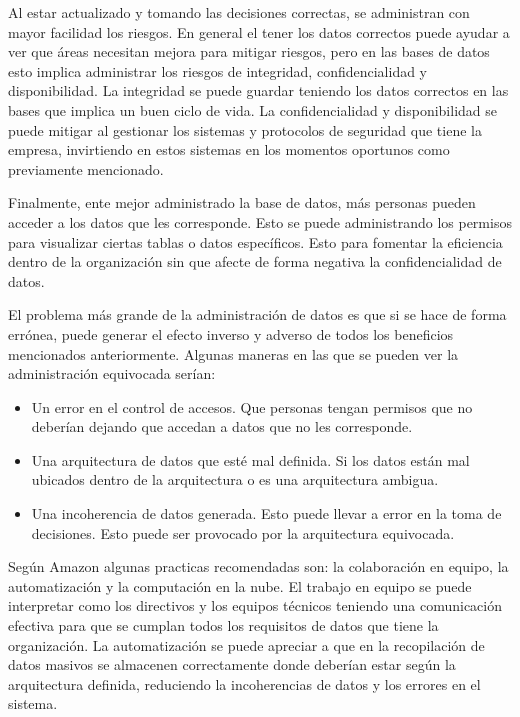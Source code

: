 \documentclass[12pt, article, natbib]{IEEEtran}
\begin{document}
Al estar actualizado y tomando las decisiones correctas, se administran con mayor facilidad los riesgos. En general el tener los datos correctos puede ayudar a ver que áreas necesitan mejora para mitigar riesgos, pero en las bases de datos esto implica administrar los riesgos de integridad, confidencialidad y disponibilidad. La integridad se puede guardar teniendo los datos correctos en las bases que implica un buen ciclo de vida. La confidencialidad y disponibilidad se puede mitigar al gestionar los sistemas y protocolos de seguridad que tiene la empresa, invirtiendo en estos sistemas en los momentos oportunos como previamente mencionado.

Finalmente, ente mejor administrado la base de datos, más personas pueden acceder a los datos que les corresponde. Esto se puede administrando los permisos para visualizar ciertas tablas o datos específicos. Esto para fomentar la eficiencia dentro de la organización sin que afecte de forma negativa la confidencialidad de datos.

El problema más grande de la administración de datos es que si se hace de forma errónea, puede generar el efecto inverso y adverso de todos los beneficios mencionados anteriormente. Algunas maneras en las que se pueden ver la administración equivocada serían:
\begin{itemize}
	\item Un error en el control de accesos. Que personas tengan permisos que no deberían dejando que accedan a datos que no les corresponde.
	\item Una arquitectura de datos que esté mal definida. Si los datos están mal ubicados dentro de la arquitectura o es una arquitectura ambigua.
	\item Una incoherencia de datos generada. Esto puede llevar a error en la toma de decisiones. Esto puede ser provocado por la arquitectura equivocada.
\end{itemize}

Según Amazon \cite{amazonbasesdedatos} algunas practicas recomendadas son: la colaboración en equipo, la automatización y la computación en la nube. El trabajo en equipo se puede interpretar como los directivos y los equipos técnicos teniendo una comunicación efectiva para que se cumplan todos los requisitos de datos que tiene la organización. La automatización se puede apreciar a que en la recopilación de datos masivos se almacenen correctamente donde deberían estar según la arquitectura definida, reduciendo la incoherencias de datos y los errores en el sistema. 
\end{document}

